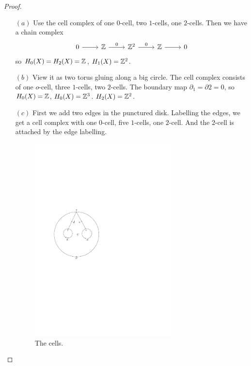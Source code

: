 \begin{proof}
\mbox{}
\begin{itemize}
\item[$(a)$]Use the cell complex of one $0$-cell, two $1$-cells, one $2$-cells. Then we have a chain complex
\[\begin{tikzcd}
0\ar[r]&\Z\ar[r,"0"]&\Z^2\ar[r,"0"]&\Z\ar[r]&0
\end{tikzcd}\]
so $H_0(X)=H_2(X)=\mathbb{Z}$, $H_1(X)=\mathbb{Z}^2$.
\item[$(b)$]View it as two torus gluing along a big circle. The cell complex consists of one $o$-cell, three $1$-cells, two $2$-cells. The boundary map $\partial_1=\partial 2=0$, so $H_0(X)=\mathbb{Z}$, $H_0(X)=\mathbb{Z}^3$. $H_2(X)=\mathbb{Z}^2$.
\item[$(c)$]First we add two edges in the punctured disk. Labelling the edges, we get a cell complex with one $0$-cell, five $1$-cells, one $2$-cell. And the $2$-cell is attached by the edge labelling.
\begin{figure}[htpb]
\centering
\begin{minipage}{200pt}
\centering
\includegraphics[width=0.7\textwidth]{pictures/cell-1}
\caption{The cells.}
\end{minipage}
\hspace{20pt}
\begin{minipage}{200pt}
\centering

\end{minipage}
\end{figure}
\end{itemize}
\end{proof}
